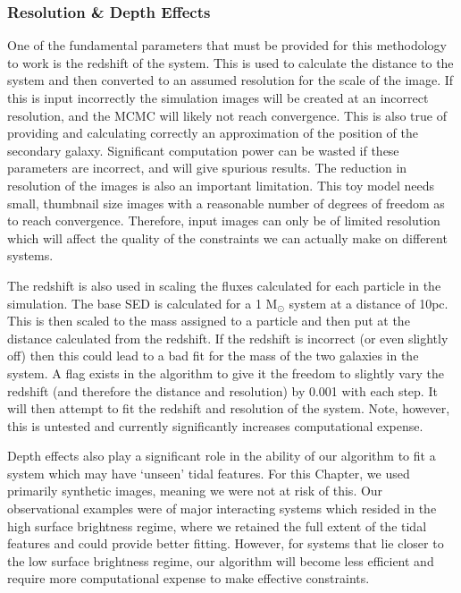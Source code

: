 \subsubsection{Resolution \& Depth Effects}\label{resolution_effect}
\noindent One of the fundamental parameters that must be provided for this methodology to work is the redshift of the system. This is used to calculate the distance to the system and then converted to an assumed resolution for the scale of the image. If this is input incorrectly the simulation images will be created at an incorrect resolution, and the MCMC will likely not reach convergence. This is also true of providing and calculating correctly an approximation of the position of the secondary galaxy. Significant computation power can be wasted if these parameters are incorrect, and will give spurious results. The reduction in resolution of the images is also an important limitation. This toy model needs small, thumbnail size images with a reasonable number of degrees of freedom as to reach convergence. Therefore, input images can only be of limited resolution which will affect the quality of the constraints we can actually make on different systems. 

The redshift is also used in scaling the fluxes calculated for each particle in the simulation. The base SED is calculated for a 1 M$_\odot$ system at a distance of 10pc. This is then scaled to the mass assigned to a particle and then put at the distance calculated from the redshift. If the redshift is incorrect (or even slightly off) then this could lead to a bad fit for the mass of the two galaxies in the system. A flag exists in the algorithm to give it the freedom to slightly vary the redshift (and therefore the distance and resolution) by 0.001 with each step. It will then attempt to fit the redshift and resolution of the system. Note, however, this is untested and currently significantly increases computational expense.

Depth effects also play a significant role in the ability of our algorithm to fit a system which may have `unseen' tidal features. For this Chapter, we used primarily synthetic images, meaning we were not at risk of this. Our observational examples were of major interacting systems which resided in the high surface brightness regime, where we retained the full extent of the tidal features and could provide better fitting. However, for systems that lie closer to the low surface brightness regime, our algorithm will become less efficient and require more computational expense to make effective constraints.

